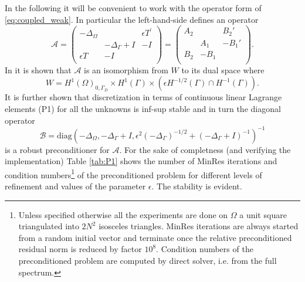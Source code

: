 \documentclass[r]{siamart171218}
\begin{document}
In the following it will be convenient to work with the operator form of
\eqref{eq:coupled_weak}. In particular the left-hand-side defines an operator
%
\begin{equation}\label{eq:operator2d}
  \mathcal{A} = \begin{pmatrix}
    -\Delta_{\Omega} & & \epsilon T^{\prime}\\
    & -\Delta_{\Gamma} + I & -I\\
    \epsilon T & -I & \\
  \end{pmatrix} =
  \begin{pmatrix}
    A_2 &  & B_2'\\
    & A_1 & -B_1'\\
    B_2 & -B_1 & \\
   \end{pmatrix}.
\end{equation}
In \cite{kuchta2016preconditioners} it is shown that $\mathcal{A}$ is an
isomorphism from $W$ to its dual space where
\[
W=H^1(\Omega)_{0, \Gamma_D}\times H^1{(\Gamma)}\times(\epsilon H^{-1/2}(\Gamma)\cap H^{-1}(\Gamma)).
\]
It is further shown that discretization in terms of continuous linear Lagrange
elements (P1) for all the unknowns is inf-sup stable and in turn the diagonal operator
\begin{equation}\label{eq:P1_precond}
\mathcal{B}=\text{diag}(-\Delta_{\Omega}, -\Delta_{\Gamma}+I, \epsilon^2(-\Delta_{\Gamma})^{-1/2}+(-\Delta_{\Gamma}+I)^{-1})^{-1}
\end{equation}
is a robust preconditioner for $\mathcal{A}$. For the sake of completness
(and verifying the implementation) Table \ref{tab:P1} shows the number of
MinRes iterations and condition numbers\footnote{
  Unless specified otherwise all the experiments are done on $\Omega$ a unit square
  triangulated into $2N^2$ isosceles triangles. MinRes iterations are always started
  from a random initial vector and terminate once the relative preconditioned residual
  norm is reduced by factor $10^{8}$. Condition numbers of the preconditioned problem
  are computed by direct solver, i.e. from the full spectrum.
} of the preconditioned problem for
different levels of refinement and values of the parameter $\epsilon$. The
stability is evident.
%
\end{document}
